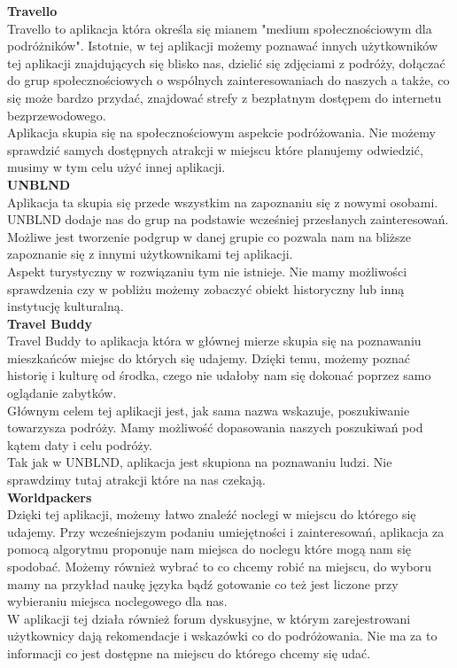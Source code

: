     \textbf{Travello} \\
    Travello to aplikacja która określa się mianem "medium społecznościowym dla podróżników". Istotnie, w tej aplikacji możemy poznawać innych użytkowników tej aplikacji znajdujących się blisko nas, dzielić się zdjęciami z podróży, dołączać do grup społecznościowych o wspólnych zainteresowaniach do naszych a także, co się może bardzo przydać, znajdować strefy z bezpłatnym dostępem do internetu bezprzewodowego. \\
    Aplikacja skupia się na społecznościowym aspekcie podróżowania. Nie możemy sprawdzić samych dostępnych atrakcji w miejscu które planujemy odwiedzić, musimy w tym celu użyć innej aplikacji. \\ 

    \textbf{UNBLND} \\ 
    Aplikacja ta skupia się przede wszystkim na zapoznaniu się z nowymi osobami. UNBLND dodaje nas do grup na podstawie wcześniej przesłanych zainteresowań. Możliwe jest tworzenie podgrup w danej grupie co pozwala nam na bliższe zapoznanie się z innymi użytkownikami tej aplikacji. \\
    Aspekt turystyczny w rozwiązaniu tym nie istnieje. Nie mamy możliwości sprawdzenia czy w pobliżu możemy zobaczyć obiekt historyczny lub inną instytucję kulturalną. \\

    \textbf{Travel Buddy} \\ 
    Travel Buddy to aplikacja która w głównej mierze skupia się na poznawaniu mieszkańców miejsc do których się udajemy. Dzięki temu, możemy poznać historię i kulturę od środka, czego nie udałoby nam się dokonać poprzez samo oglądanie zabytków. \\ 
    Głównym celem tej aplikacji jest, jak sama nazwa wskazuje, poszukiwanie towarzysza podróży. Mamy możliwość dopasowania naszych poszukiwań pod kątem daty i celu podróży. \\
    Tak jak w UNBLND, aplikacja jest skupiona na poznawaniu ludzi. Nie sprawdzimy tutaj atrakcji które na nas czekają. \\

    \textbf{Worldpackers} \\ 
    Dzięki tej aplikacji, możemy łatwo znaleźć noclegi w miejscu do którego się udajemy. Przy wcześniejszym podaniu umiejętności i zainteresowań, aplikacja za pomocą algorytmu proponuje nam miejsca do noclegu które mogą nam się spodobać. Możemy również wybrać to co chcemy robić na miejscu, do wyboru mamy na przykład naukę języka bądź gotowanie co też jest liczone przy wybieraniu miejsca noclegowego dla nas. \\
    W aplikacji tej działa również forum dyskusyjne, w którym zarejestrowani użytkownicy dają rekomendacje i wskazówki co do podróżowania. Nie ma za to informacji co jest dostępne na miejscu do którego chcemy się udać. \\

